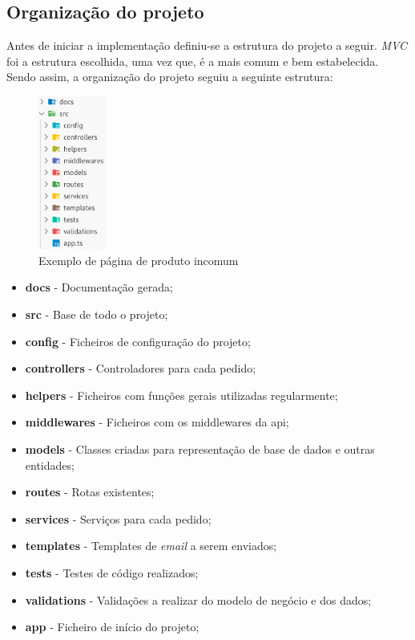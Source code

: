 \subsection{Organização do projeto}
Antes de iniciar a implementação definiu-se a estrutura do projeto a seguir. \textit{MVC} foi a estrutura escolhida, uma vez que, é a mais comum e bem estabelecida. Sendo assim, a organização do projeto seguiu a seguinte estrutura:
\begin{figure}[htb]
 \centering
 \includegraphics[width=0.2\textwidth]{images/implementacao/api/project_organization.png}
 \caption{Exemplo de página de produto incomum}
 \label{fig:63}
\end{figure}

\begin{itemize}
 \item \textbf{docs} - Documentação gerada;
 \item \textbf{src} - Base de todo o projeto;
 \item \textbf{config} - Ficheiros de configuração do projeto;
 \item \textbf{controllers} - Controladores para cada pedido;
 \item \textbf{helpers} - Ficheiros com funções gerais utilizadas regularmente;
 \item \textbf{middlewares} - Ficheiros com os middlewares da api;
 \item \textbf{models} - Classes criadas para representação de base de dados e outras entidades;
 \item \textbf{routes} - Rotas existentes;
 \item \textbf{services} - Serviços para cada pedido;
 \item \textbf{templates} - Templates de \textit{email} a serem enviados;
 \item \textbf{tests} - Testes de código realizados;
 \item \textbf{validations} - Validações a realizar do modelo de negócio e dos dados;
 \item \textbf{app} - Ficheiro de início do projeto;
\end{itemize}
